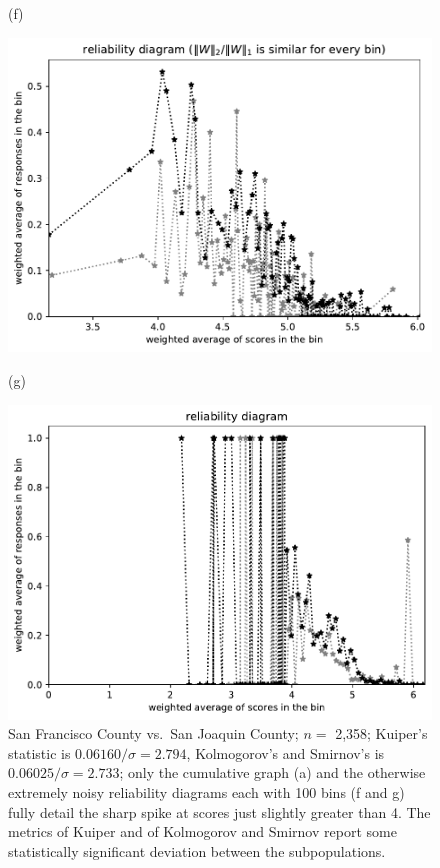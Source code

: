 \documentclass{article}
\newlength{\imsize}
\begin{document}
\begin{figure}
\begin{centering}
(f)
\parbox{\imsize}{\includegraphics[width=\imsize]
{../codes/weighted/County_of_San_Francisco_vs_San_Joaquin-LNGI/equierrs100.pdf}}
\quad\quad
(g)
\parbox{\imsize}{\includegraphics[width=\imsize]
{../codes/weighted/County_of_San_Francisco_vs_San_Joaquin-LNGI/equiscores100.pdf}}

\end{centering}
\caption{San Francisco County vs.\ San Joaquin County; $n =$ 2,358;
         Kuiper's statistic is $0.06160 / \sigma = 2.794$,
         Kolmogorov's and Smirnov's is $0.06025 / \sigma = 2.733$;
         only the cumulative graph (a) and the otherwise extremely noisy
         reliability diagrams each with 100 bins (f and g) fully detail
         the sharp spike at scores just slightly greater than 4.
         The metrics of Kuiper and of Kolmogorov and Smirnov report
         some statistically significant deviation between the subpopulations.
}
\label{San_Francisco-San_Joaquin}
\end{figure}
\end{document}
